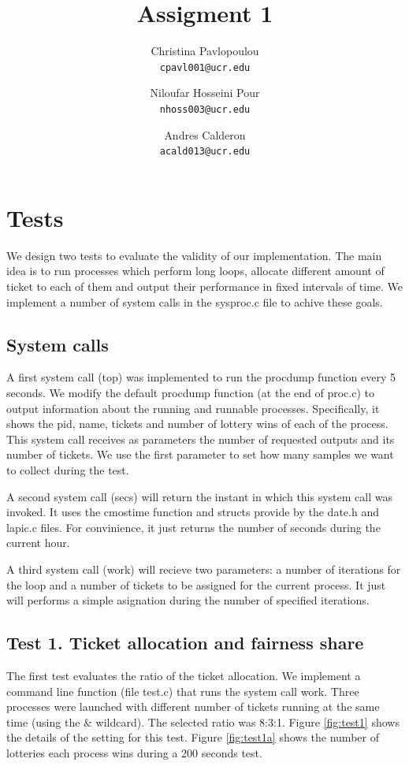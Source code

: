 \documentclass[10pt]{scrartcl}
\title{Assigment 1}
\author{
   Christina Pavlopoulou\\
  \small \texttt{cpavl001@ucr.edu}
  \and
   Niloufar Hosseini Pour\\
  \small \texttt{nhoss003@ucr.edu}
  \and
   Andres Calderon\\
  \small \texttt{acald013@ucr.edu}
}
\begin{document}
\tiny
\maketitle
\normalsize

\section{Tests}

We design two tests to evaluate the validity of our implementation. The main idea is to run processes which  perform long loops, allocate different amount of ticket to each of them and output their performance in fixed intervals of time.  We implement a number of system calls in the sysproc.c file to achive these goals.

\subsection{System calls}
A first system call (top) was implemented to run the procdump function every 5 seconds. We modify the default procdump function (at the end of proc.c) to output information about the running and runnable processes.  Specifically, it shows the pid, name, tickets and number of lottery wins of each of the process. This system call receives as parameters the number of requested outputs and its number of tickets.  We use the first parameter to set how many samples we want to collect during the test.

A second system call (secs) will return the instant in which this system call was invoked.  It uses the cmostime function and structs provide by the date.h and lapic.c files.  For convinience, it just returns the number of seconds during the current hour.

A third system call (work) will recieve two parameters: a number of iterations for the loop and a number of tickets to be assigned for the current process.  It just will performs a simple asignation during the number of specified iterations.

\subsection{Test 1. Ticket allocation and fairness share}
The first test evaluates the ratio of the ticket allocation.  We implement a command line function (file test.c) that runs the system call work.  Three processes were launched with different number of tickets running at the same time (using the \& wildcard).  The selected ratio was 8:3:1.  Figure \ref{fig:test1} shows the details of the setting for this test. Figure \ref{fig:test1a} shows the number of lotteries each process wins during a 200 seconds test. 
\end{document}
